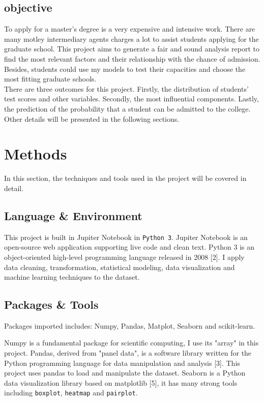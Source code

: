 \documentclass[12pt]{article}
\begin{document}
\begin{sloppypar}
\subsection{objective}

To apply for a master's degree is a very expensive and intensive work. There are many motley intermediary agents charges a lot to assist students applying for the graduate school. This project aims to generate a fair and sound analysis report to find the most relevant factors and their relationship with the chance of admission. Besides, students could use my models to test their capacities and choose the most fitting graduate schools.\\
There are three outcomes for this project. Firstly, the distribution of students' test scores and other variables. Secondly, the most influential components. Lastly, the prediction of the probability that a student can be admitted to the college. Other details will be presented in the following sections. 

\section{Methods}

In this section, the techniques and tools used in the project will be covered in detail. 

\subsection{Language \& Environment}

This project is built in Jupiter Notebook in \texttt{Python 3}. Jupiter Notebook is an open-source web application supporting live code and clean text. Python 3 is an object-oriented high-level programming language released in 2008 [2]. I apply data cleaning, transformation, statistical modeling, data visualization and machine learning techniques to the dataset.
\subsection{Packages \& Tools}

Packages imported includes: Numpy, Pandas, Matplot, Seaborn and scikit-learn.

Numpy is a fundamental package for scientific computing, I use its "array" in this project. Pandas, derived from "panel data", is a software library written for the Python programming language for data manipulation and analysis [3]. This project uses pandas to load and manipulate the dataset. Seaborn is a Python data visualization library based on matplotlib [5], it has many strong tools including \texttt{boxplot}, \texttt{heatmap} and \texttt{pairplot}.


\end{sloppypar}
\end{document}
